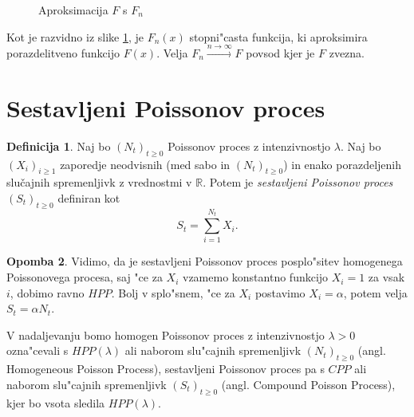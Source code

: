 \documentclass[12pt, a4paper, reqno]{amsart}
\theoremstyle{definition}
\newtheorem{definicija}{Definicija}[section]
\newtheorem{opomba}[definicija]{Opomba}
\theoremstyle{plain}
\newcommand{\1}{\mathds{1}}
\begin{document}
\begin{figure}[H]
\begin{center}
\begin{tikzpicture}
                
                
                \end{tikzpicture}
                \caption{Aproksimacija $F$ s $F_n$}
                \label{fig:slika2}
            \end{center}
        \end{figure}

    \noindent
    Kot je razvidno iz slike \ref{fig:slika2}, je $F_n(x)$ stopni"casta funkcija, ki aproksimira 
    porazdelitveno funkcijo $F(x)$. Velja $F_n \xrightarrow{n\to\infty}F$ povsod kjer je $F$ zvezna.


\section{Sestavljeni Poissonov proces}

    \begin{center}
    \end{center}
    \begin{definicija}
        Naj bo $(N_t)_{t\geq0}$ Poissonov proces z intenzivnostjo $\lambda$. 
        Naj bo $(X_i)_{i\geq1}$ zaporedje neodvisnih (med sabo in $(N_t)_{t\geq0}$) in enako 
        porazdeljenih slučajnih spremenljivk z vrednostmi v $\mathbb{R}$. Potem je 
        \textit{sestavljeni Poissonov proces} $(S_t)_{t\geq0}$ definiran kot
        $$
            S_t = \sum_{i=1}^{N_t} X_i.
        $$
        \label{def:CPP}
    \end{definicija}

    \begin{opomba}
        Vidimo, da je sestavljeni Poissonov proces posplo"sitev homogenega Poissonovega procesa, saj "ce za
        $X_i$ vzamemo konstantno funkcijo $X_i = 1$ za vsak $i$, dobimo ravno $HPP$. Bolj v splo"snem, "ce za $X_i$ 
        postavimo $X_i = \alpha$, potem velja $S_t = \alpha N_t$.
        \label{op:CPPHPPPovezava}
    \end{opomba}

    V nadaljevanju bomo homogen Poissonov proces z intenzivnostjo $\lambda >0$ ozna"cevali s $HPP(\lambda)$ 
    ali naborom slu"cajnih spremenljivk $(N_t)_{t\geq0}$ (angl. Homogeneous Poisson Process), 
    sestavljeni Poissonov proces pa s $CPP$ ali naborom slu"cajnih spremenljivk $(S_t)_{t\geq0}$ 
    (angl. Compound Poisson Process), kjer bo vsota sledila $HPP(\lambda)$.
\end{document}
